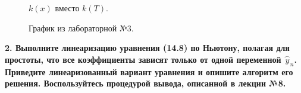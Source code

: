 \documentclass[a4paper,14pt]{article}
\begin{document}
\newpage
\begin{figure}[!h]
	\caption{$k(x)$ вместо $k(T)$.}
	\label{fig:image}
\end{figure}

\newpage
\begin{figure}[!h]
	\caption{График из лабораторной №3.}
	\label{fig:image}
\end{figure}

\newpage
\textbf{2. Выполните линеаризацию уравнения (14.8) по Ньютону, 
полагая для простоты, что все коэффициенты зависят только от одной 
переменной $\stackrel{\frown}{y}_n$. Приведите линеаризованный вариант уравнения и опишите алгоритм его решения. Воспользуйтесь процедурой вывода, описанной в лекции №8.}
\end{document}
